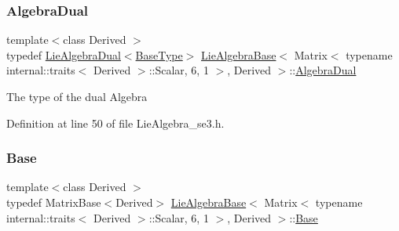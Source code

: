 \subsubsection{\texorpdfstring{Algebra\+Dual}{AlgebraDual}}
{\footnotesize\ttfamily template$<$class Derived $>$ \\
typedef \hyperlink{class_lie_algebra_dual}{Lie\+Algebra\+Dual}$<$\hyperlink{class_lie_algebra_base_3_01_matrix_3_01typename_01internal_1_1traits_3_01_derived_01_4_1_1_scala449314c781550590437697c4dc21a6d4_abb811fe29a9ece0ee6f2239f17fea23f}{Base\+Type}$>$ \hyperlink{class_lie_algebra_base}{Lie\+Algebra\+Base}$<$ Matrix$<$ typename internal\+::traits$<$ Derived $>$\+::Scalar, 6, 1 $>$, Derived $>$\+::\hyperlink{class_lie_algebra_base_3_01_matrix_3_01typename_01internal_1_1traits_3_01_derived_01_4_1_1_scala449314c781550590437697c4dc21a6d4_abdcc3b581461214bd08505af9fbd25d8}{Algebra\+Dual}}

The type of the dual Algebra 

Definition at line 50 of file Lie\+Algebra\+\_\+se3.\+h.

\hypertarget{class_lie_algebra_base_3_01_matrix_3_01typename_01internal_1_1traits_3_01_derived_01_4_1_1_scala449314c781550590437697c4dc21a6d4_a0ab68a3ff4a7f5f7b3682db1dde89651}{}\label{class_lie_algebra_base_3_01_matrix_3_01typename_01internal_1_1traits_3_01_derived_01_4_1_1_scala449314c781550590437697c4dc21a6d4_a0ab68a3ff4a7f5f7b3682db1dde89651} 
\subsubsection{\texorpdfstring{Base}{Base}}
{\footnotesize\ttfamily template$<$class Derived $>$ \\
typedef Matrix\+Base$<$Derived$>$ \hyperlink{class_lie_algebra_base}{Lie\+Algebra\+Base}$<$ Matrix$<$ typename internal\+::traits$<$ Derived $>$\+::Scalar, 6, 1 $>$, Derived $>$\+::\hyperlink{class_lie_algebra_base_3_01_matrix_3_01typename_01internal_1_1traits_3_01_derived_01_4_1_1_scala449314c781550590437697c4dc21a6d4_a0ab68a3ff4a7f5f7b3682db1dde89651}{Base}\hspace{0.3cm}{\ttfamily [protected]}}

